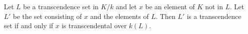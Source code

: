 Let $L$ be a transcendence set in $K/k$ and let $x$ be an element of $K$ not in $L$. Let $L'$ be the set consisting of $x$ and the elements of $L$. Then $L'$ is a transcendence set if and only if $x$ is transcendental over $k(L)$.
